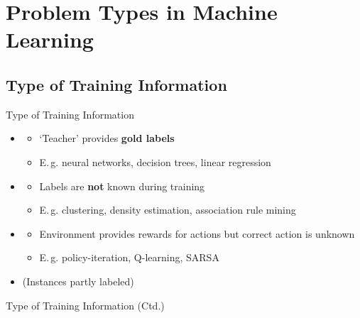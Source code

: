 \section{Problem Types in Machine Learning}

\subsection{Type of Training Information}

\begin{frame}{Type of Training Information}{}
	\begin{itemize}
		\item {}
		\begin{itemize}
			\item `Teacher' provides \textbf{gold labels}
			\item E.\,g. neural networks, decision trees, linear regression
		\end{itemize}
		\item {}
		\begin{itemize}
			\item Labels are \textbf{not} known during training
			\item E.\,g. clustering, density estimation, association rule mining
		\end{itemize}
		\item {}
		\begin{itemize}
			\item Environment provides rewards for actions but correct action is unknown
			\item E.\,g. policy-iteration, Q-learning, SARSA
		\end{itemize}
		\item {} (Instances partly labeled)
	\end{itemize}
\end{frame}


\begin{frame}{Type of Training Information (Ctd.)}{}
	
\end{frame}


